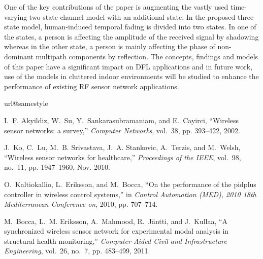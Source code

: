 \documentclass[journal, 10pt, twocolumn, balance]{IEEEtran}
\begin{document}
One of the key contributions of the paper is augmenting the vastly used time-varying two-state channel model with an additional state. In the proposed three-state model, human-induced temporal fading is divided into two states. In one of the states, a person is affecting the amplitude of the received signal by shadowing whereas in the other state, a person is mainly affecting the phase of non-dominant multipath components by reflection. The concepts, findings and models of this paper have a significant impact on DFL applications and in future work, use of the models in cluttered indoor environments will be studied to enhance the performance of existing RF sensor network applications.



\begin{thebibliography}{10}
\providecommand{\url}[1]{#1}
\csname url@samestyle\endcsname
\providecommand{\newblock}{\relax}
\providecommand{\bibinfo}[2]{#2}
\providecommand{\BIBentrySTDinterwordspacing}{\spaceskip=0pt\relax}
\providecommand{\BIBentryALTinterwordstretchfactor}{4}
\providecommand{\BIBentryALTinterwordspacing}{\spaceskip=\fontdimen2\font plus
\BIBentryALTinterwordstretchfactor\fontdimen3\font minus
  \fontdimen4\font\relax}
\providecommand{\BIBforeignlanguage}[2]{{\expandafter\ifx\csname l@#1\endcsname\relax
\typeout{** WARNING: IEEEtran.bst: No hyphenation pattern has been}\typeout{** loaded for the language `#1'. Using the pattern for}\typeout{** the default language instead.}\else
\language=\csname l@#1\endcsname
\fi
#2}}
\providecommand{\BIBdecl}{\relax}
\BIBdecl

I.~F. Akyildiz, W.~Su, Y.~Sankarasubramaniam, and E.~Cayirci, ``{Wireless
  sensor networks: a survey},'' \emph{Computer Networks}, vol.~38, pp.
  393--422, 2002.

J.~Ko, C.~Lu, M.~B. Srivastava, J.~A. Stankovic, A.~Terzis, and M.~Welsh,
  ``Wireless sensor networks for healthcare,'' \emph{Proceedings of the IEEE},
  vol.~98, no.~11, pp. 1947--1960, Nov. 2010.

O.~Kaltiokallio, L.~Eriksson, and M.~Bocca, ``On the performance of the pidplus
  controller in wireless control systems,'' in \emph{Control Automation (MED),
  2010 18th Mediterranean Conference on}, 2010, pp. 707--714.

M.~Bocca, L.~M. Eriksson, A.~Mahmood, R.~J\"{a}ntti, and J.~Kullaa, ``A
  synchronized wireless sensor network for experimental modal analysis in
  structural health monitoring,'' \emph{Computer-Aided Civil and Infrastructure
  Engineering}, vol.~26, no.~7, pp. 483--499, 2011.


\end{thebibliography}
\end{document}

